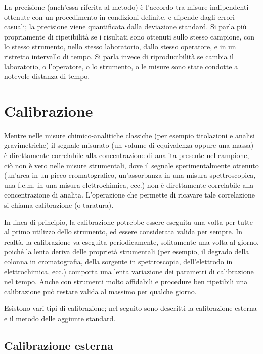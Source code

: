 La precisione (anch'essa riferita al metodo) è l'accordo tra misure indipendenti ottenute con un procedimento in condizioni definite, e dipende dagli errori casuali; la precisione viene quantificata dalla deviazione standard. Si parla più propriamente di ripetibilità se i risultati sono ottenuti sullo stesso campione, con lo stesso strumento, nello stesso laboratorio, dallo stesso operatore, e in un ristretto intervallo di tempo. Si parla invece di riproducibilità se cambia il laboratorio, o l'operatore, o lo strumento, o le misure sono state condotte a notevole distanza di tempo.



\section{Calibrazione}

Mentre nelle misure chimico-analitiche classiche (per esempio titolazioni e analisi gravimetriche) il segnale misurato (un volume di equivalenza oppure una massa) è direttamente correlabile alla concentrazione di analita presente nel campione, ciò non è vero nelle misure strumentali, dove il segnale sperimentalmente ottenuto (un'area in un picco cromatografico, un'assorbanza in una misura spettroscopica, una f.e.m. in una misura elettrochimica, ecc.) non è direttamente correlabile alla concentrazione di analita. L'operazione che permette di ricavare tale correlazione si chiama calibrazione (o taratura).

In linea di principio, la calibrazione potrebbe essere eseguita una volta per tutte al primo utilizzo dello strumento, ed essere considerata valida per sempre. In realtà, la calibrazione va eseguita periodicamente, solitamente una volta al giorno, poiché la lenta deriva delle proprietà strumentali (per esempio, il degrado della colonna in cromatografia, della sorgente in spettroscopia, dell'elettrodo in elettrochimica, ecc.) comporta una lenta variazione dei parametri di calibrazione nel tempo. Anche con strumenti molto affidabili e procedure ben ripetibili una calibrazione può restare valida al massimo per qualche giorno.

Esistono vari tipi di calibrazione; nel seguito sono descritti la calibrazione esterna e il metodo delle aggiunte standard.

\subsection{Calibrazione esterna}

